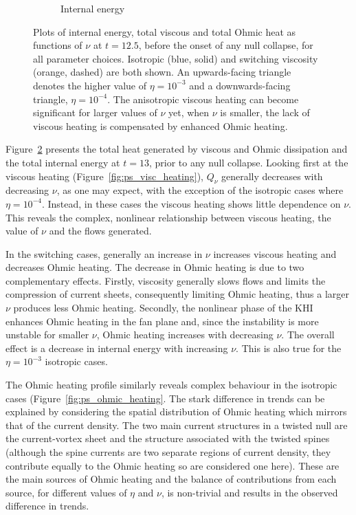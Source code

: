 \begin{figure}[t]
\begin{subfigure}{0.32\textwidth}
      \caption{Internal energy}%
      \label{fig:ps_interal_energy}
    \end{subfigure}
  \caption{Plots of internal energy, total viscous and total Ohmic heat as functions of $\nu$ at $t=12.5$, before the onset of any null collapse, for all parameter choices. Isotropic (blue, solid) and switching viscosity (orange, dashed) are both shown. An upwards-facing triangle denotes the higher value of $\eta=10^{-3}$ and a downwards-facing triangle, $\eta=10^{-4}$. The anisotropic viscous heating can become significant for larger values of $\nu$ yet, when $\nu$ is smaller, the lack of viscous heating is compensated by enhanced Ohmic heating. }%
  \label{fig:ps_heating}
\end{figure}

Figure~\ref{fig:ps_heating} presents the total heat generated by viscous and Ohmic dissipation and the total internal energy at $t=13$, prior to any null collapse. Looking first at the viscous heating (Figure~\ref{fig:ps_visc_heating}), $Q_{\nu}$ generally decreases with decreasing $\nu$, as one may expect, with the exception of the isotropic cases where $\eta=10^{-4}$. Instead, in these cases the viscous heating shows little dependence on $\nu$. This reveals the complex, nonlinear relationship between viscous heating, the value of $\nu$ and the flows generated.

In the switching cases, generally an increase in $\nu$ increases viscous heating and decreases Ohmic heating. The decrease in Ohmic heating is due to two complementary effects. Firstly, viscosity generally slows flows and limits the compression of current sheets, consequently limiting Ohmic heating, thus a larger $\nu$ produces less Ohmic heating. Secondly, the nonlinear phase of the KHI enhances Ohmic heating in the fan plane and, since the instability is more unstable for smaller $\nu$, Ohmic heating increases with decreasing $\nu$. The overall effect is a decrease in internal energy with increasing $\nu$. This is also true for the $\eta=10^{-3}$ isotropic cases.

The Ohmic heating profile similarly reveals complex behaviour in the isotropic cases (Figure~\ref{fig:ps_ohmic_heating}. The stark difference in trends can be explained by considering the spatial distribution of Ohmic heating which mirrors that of the current density. The two main current structures in a twisted null are the current-vortex sheet and the structure associated with the twisted spines (although the spine currents are two separate regions of current density, they contribute equally to the Ohmic heating so are considered one here). These are the main sources of Ohmic heating and the balance of contributions from each source, for different values of $\eta$ and $\nu$, is non-trivial and results in the observed difference in trends.

